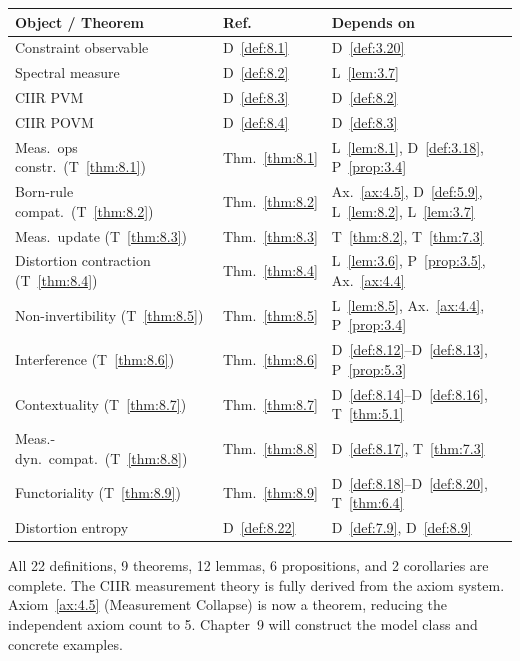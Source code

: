 \begin{center}
\begin{tabular}{lll}
\hline
\textbf{Object / Theorem} & \textbf{Ref.} & \textbf{Depends on} \\
\hline
Constraint observable & D~\ref{def:8.1} &
  D~\ref{def:3.20} \\
Spectral measure & D~\ref{def:8.2} &
  L~\ref{lem:3.7} \\
CIIR PVM & D~\ref{def:8.3} &
  D~\ref{def:8.2} \\
CIIR POVM & D~\ref{def:8.4} &
  D~\ref{def:8.3} \\
Meas.\ ops constr.\ (T~\ref{thm:8.1}) & Thm.~\ref{thm:8.1} &
  L~\ref{lem:8.1}, D~\ref{def:3.18}, P~\ref{prop:3.4} \\
Born-rule compat.\ (T~\ref{thm:8.2}) & Thm.~\ref{thm:8.2} &
  Ax.~\ref{ax:4.5}, D~\ref{def:5.9}, L~\ref{lem:8.2}, L~\ref{lem:3.7} \\
Meas.\ update (T~\ref{thm:8.3}) & Thm.~\ref{thm:8.3} &
  T~\ref{thm:8.2}, T~\ref{thm:7.3} \\
Distortion contraction (T~\ref{thm:8.4}) & Thm.~\ref{thm:8.4} &
  L~\ref{lem:3.6}, P~\ref{prop:3.5}, Ax.~\ref{ax:4.4} \\
Non-invertibility (T~\ref{thm:8.5}) & Thm.~\ref{thm:8.5} &
  L~\ref{lem:8.5}, Ax.~\ref{ax:4.4}, P~\ref{prop:3.4} \\
Interference (T~\ref{thm:8.6}) & Thm.~\ref{thm:8.6} &
  D~\ref{def:8.12}--D~\ref{def:8.13}, P~\ref{prop:5.3} \\
Contextuality (T~\ref{thm:8.7}) & Thm.~\ref{thm:8.7} &
  D~\ref{def:8.14}--D~\ref{def:8.16}, T~\ref{thm:5.1} \\
Meas.-dyn.\ compat.\ (T~\ref{thm:8.8}) & Thm.~\ref{thm:8.8} &
  D~\ref{def:8.17}, T~\ref{thm:7.3} \\
Functoriality (T~\ref{thm:8.9}) & Thm.~\ref{thm:8.9} &
  D~\ref{def:8.18}--D~\ref{def:8.20}, T~\ref{thm:6.4} \\
Distortion entropy & D~\ref{def:8.22} &
  D~\ref{def:7.9}, D~\ref{def:8.9} \\
\hline
\end{tabular}
\end{center}

\medskip
\noindent
All 22 definitions, 9 theorems, 12 lemmas, 6 propositions, and 2
corollaries are complete.  The CIIR measurement theory is fully derived
from the axiom system.  Axiom~\ref{ax:4.5} (Measurement Collapse) is
now a theorem, reducing the independent axiom count to 5.
Chapter~9 will construct the model class and concrete examples.
